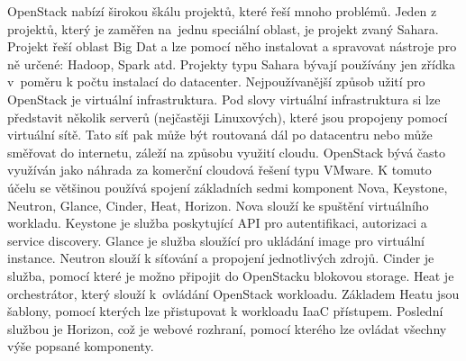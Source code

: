 OpenStack nabízí širokou škálu projektů, které řeší mnoho problémů. Jeden z projektů, který je zaměřen na jednu speciální oblast, je projekt zvaný Sahara. Projekt řeší oblast Big Dat a lze pomocí něho instalovat a spravovat nástroje pro ně určené: Hadoop, Spark atd. Projekty typu Sahara bývají používány jen zřídka v poměru k počtu instalací do datacenter. Nejpoužívanější způsob užití pro OpenStack je virtuální infrastruktura. Pod slovy virtuální infrastruktura si lze představit několik serverů (nejčastěji Linuxových), které jsou propojeny pomocí virtuální sítě. Tato síť pak může být routovaná dál po datacentru nebo může směřovat do internetu, záleží na způsobu využití cloudu. OpenStack bývá často využíván jako náhrada za komerční cloudová řešení typu VMware. K tomuto účelu se většinou používá spojení základních sedmi komponent Nova, Keystone, Neutron, Glance, Cinder, Heat, Horizon. Nova slouží ke spuštění virtuálního workladu. Keystone je služba poskytující API pro autentifikaci, autorizaci a service discovery. Glance je služba sloužící pro ukládání image pro virtuální instance. Neutron slouží k síťování a propojení jednotlivých zdrojů. Cinder je služba, pomocí které je možno připojit do OpenStacku blokovou storage. Heat je orchestrátor, který slouží k ovládání OpenStack workloadu. Základem Heatu jsou šablony, pomocí kterých lze přistupovat k workloadu IaaC přístupem. Poslední službou je Horizon, což je webové rozhraní, pomocí kterého lze ovládat všechny výše popsané komponenty.

